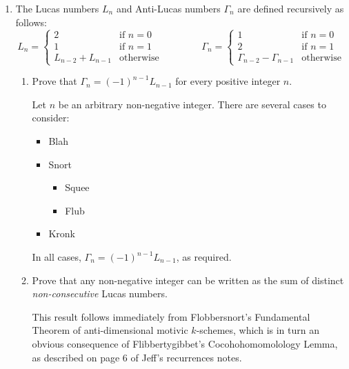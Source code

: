 \documentclass[11pt]{article}
\begin{document}
\small\sf
\begin{enumerate}
\parindent 1.5em \itemsep 0.5in plus 0.25fil

\newpage
\def\arraystretch{1.2}

\item
The Lucas numbers $L_n$ and Anti-Lucas numbers $\Gamma_n$ are defined recursively as follows:
\[
	L_n = \begin{cases}
		2 & \text{if $n=0$}\\
		1 & \text{if $n=1$}\\
		L_{n-2} + L_{n-1} & \text{otherwise}
	\end{cases}
	\qquad\qquad
		\Gamma_n = \begin{cases}
		1 & \text{if $n=0$}\\
		2 & \text{if $n=1$}\\
		\Gamma_{n-2} - \Gamma_{n-1} & \text{otherwise}
	\end{cases}
\]

\begin{enumerate}
\item
Prove that $\Gamma_n = (-1)^{n-1} L_{n-1}$ for every positive integer $n$.

\begin{solution}[induction]
Let $n$ be an arbitrary non-negative integer.  There are several cases to consider:
\begin{itemize}
\item
Blah

\item
Snort
\begin{itemize}
\item
Squee

\item
Flub
\end{itemize}

\item
Kronk
\end{itemize}
In all cases, $\Gamma_n = (-1)^{n-1} L_{n-1}$, as required.
\end{solution}

\bigskip

\item
Prove that any non-negative integer can be written as the sum of distinct \emph{non-consecutive} Lucas numbers.

\begin{solution}
This result follows immediately from Flobbersnort’s Fundamental Theorem of anti-dimensional motivic $k$-schemes, which is in turn an obvious consequence of  Flibbertygibbet’s Cocohohomomolology Lemma, as described on page 6 of Jeff’s recurrences notes.
\end{solution}


\end{enumerate}
\end{enumerate}
\end{document}
